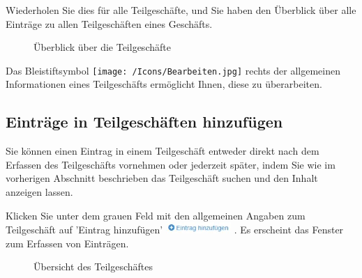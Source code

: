 \vspace{\baselineskip}

Wiederholen Sie dies für alle Teilgeschäfte, und Sie haben den Überblick über alle Einträge zu allen Teilgeschäften eines Geschäfts.

\begin{figure}[H]
\caption{Überblick über die Teilgeschäfte}
\end{figure}

Das Bleistiftsymbol \texttt{[image: /Icons/Bearbeiten.jpg]}  rechts der allgemeinen Informationen eines Teilgeschäfts ermöglicht Ihnen, diese zu überarbeiten.

\subsection{Einträge in Teilgeschäften hinzufügen}

Sie können einen Eintrag in einem Teilgeschäft entweder direkt nach dem Erfassen des Teilgeschäfts vornehmen oder jederzeit später, indem Sie wie im vorherigen Abschnitt beschrieben das Teilgeschäft suchen und den Inhalt anzeigen lassen.

Klicken Sie unter dem grauen Feld mit den allgemeinen Angaben zum Teilgeschäft auf 'Eintrag hinzufügen' \includegraphics[height=12pt]{../chapters/06_Geschaefte/pictures/6-4_TeilgeschaefteEintragHinzufuegen.jpg} . Es erscheint das Fenster zum Erfassen von Einträgen.

\begin{figure}[H]
\caption{Übersicht des Teilgeschäftes}
\end{figure}


